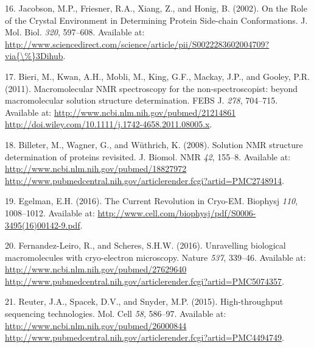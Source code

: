 \documentclass[11pt,a4paper,twoside]{book}
\theoremstyle{definition}
\theoremstyle{definition}
\theoremstyle{remark}
\begin{document}
\hypertarget{ref-Jacobson2002}{}
16. Jacobson, M.P., Friesner, R.A., Xiang, Z., and Honig, B. (2002). On
the Role of the Crystal Environment in Determining Protein Side-chain
Conformations. J. Mol. Biol. \emph{320}, 597--608. Available at:
\href{http://www.sciencedirect.com/science/article/pii/S0022283602004709?via\%7B/\%\%7D3Dihub}{http://www.sciencedirect.com/science/article/pii/S0022283602004709?via\{\textbackslash{}\%\}3Dihub}.

\hypertarget{ref-Bieri2011}{}
17. Bieri, M., Kwan, A.H., Mobli, M., King, G.F., Mackay, J.P., and
Gooley, P.R. (2011). Macromolecular NMR spectroscopy for the
non-spectroscopist: beyond macromolecular solution structure
determination. FEBS J. \emph{278}, 704--715. Available at:
\href{http://www.ncbi.nlm.nih.gov/pubmed/21214861\%20http://doi.wiley.com/10.1111/j.1742-4658.2011.08005.x}{http://www.ncbi.nlm.nih.gov/pubmed/21214861 http://doi.wiley.com/10.1111/j.1742-4658.2011.08005.x}.

\hypertarget{ref-Billeter2008}{}
18. Billeter, M., Wagner, G., and Wüthrich, K. (2008). Solution NMR
structure determination of proteins revisited. J. Biomol. NMR \emph{42},
155--8. Available at:
\href{http://www.ncbi.nlm.nih.gov/pubmed/18827972\%20http://www.pubmedcentral.nih.gov/articlerender.fcgi?artid=PMC2748914}{http://www.ncbi.nlm.nih.gov/pubmed/18827972 http://www.pubmedcentral.nih.gov/articlerender.fcgi?artid=PMC2748914}.

\hypertarget{ref-Egelman2016}{}
19. Egelman, E.H. (2016). The Current Revolution in Cryo-EM. Biophysj
\emph{110}, 1008--1012. Available at:
\url{http://www.cell.com/biophysj/pdf/S0006-3495(16)00142-9.pdf}.

\hypertarget{ref-Fernandez-Leiro2016}{}
20. Fernandez-Leiro, R., and Scheres, S.H.W. (2016). Unravelling
biological macromolecules with cryo-electron microscopy. Nature
\emph{537}, 339--46. Available at:
\href{http://www.ncbi.nlm.nih.gov/pubmed/27629640\%20http://www.pubmedcentral.nih.gov/articlerender.fcgi?artid=PMC5074357}{http://www.ncbi.nlm.nih.gov/pubmed/27629640 http://www.pubmedcentral.nih.gov/articlerender.fcgi?artid=PMC5074357}.

\hypertarget{ref-Reuter2015}{}
21. Reuter, J.A., Spacek, D.V., and Snyder, M.P. (2015). High-throughput
sequencing technologies. Mol. Cell \emph{58}, 586--97. Available at:
\href{http://www.ncbi.nlm.nih.gov/pubmed/26000844\%20http://www.pubmedcentral.nih.gov/articlerender.fcgi?artid=PMC4494749}{http://www.ncbi.nlm.nih.gov/pubmed/26000844 http://www.pubmedcentral.nih.gov/articlerender.fcgi?artid=PMC4494749}.
\end{document}
